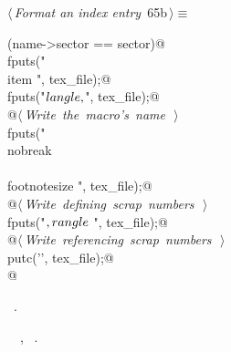 \documentclass[a4paper]{report}
\begin{document}
\begin{flushleft} \small
\begin{minipage}{\linewidth}\label{scrap128}\raggedright\small
{} $\langle\,${\it Format an index entry}\nobreak\ {\footnotesize {65b}}$\,\rangle\equiv$
\vspace{-1ex}
\begin{list}{}{} \item
\mbox{}\verb@if (name->sector == sector){@\\
\mbox{}\verb@  fputs("\\item ", tex_file);@\\
\mbox{}\verb@  fputs("$\\langle\\,$", tex_file);@\\
\mbox{}\verb@  @\hbox{$\langle\,${\it Write the macro's name}\nobreak\ {\footnotesize {}}$\,\rangle$}\verb@@\\
\mbox{}\verb@  fputs("\\nobreak\\ {\\footnotesize ", tex_file);@\\
\mbox{}\verb@  @\hbox{$\langle\,${\it Write defining scrap numbers}\nobreak\ {\footnotesize {}}$\,\rangle$}\verb@@\\
\mbox{}\verb@  fputs("}$\\,\\rangle$ ", tex_file);@\\
\mbox{}\verb@  @\hbox{$\langle\,${\it Write referencing scrap numbers}\nobreak\ {\footnotesize {}}$\,\rangle$}\verb@@\\
\mbox{}\verb@  putc('\n', tex_file);@\\
\mbox{}\verb@}@{\NWsep}
\end{list}
\vspace{-1.5ex}
\footnotesize
\begin{list}{}{\setlength{\itemsep}{-\parsep}\setlength{\itemindent}{-\leftmargin}}
\item \NWtxtMacroRefIn\ .
\item \NWtxtIdentsUsed\nobreak\  \verb@fputs@\nobreak\ , \verb@putc@\nobreak\ .
\item{}
\end{list}
\end{minipage}\vspace{4ex}
\end{flushleft}
\end{document}
